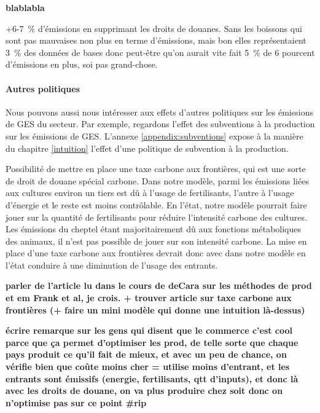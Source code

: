 \textbf{blablabla}

+6-7~\% d'émissions en supprimant les droits de douanes. Sans les boissons qui sont pas mauvaises non plus en terme d'émissions, mais bon elles représentaient 3~\% des données de bases donc peut-être qu'on aurait vite fait 5~\% de 6 pourcent d'émissions en plus, soi pas grand-chose.


\paragraph{Autres politiques}\label{Sec_subvention}
Nous pouvons aussi nous intéresser aux effets d'autres politiques sur les émissions de GES du secteur. Par exemple, regardons l'effet des subventions à la production sur les émissions de GES. L'annexe \ref{appendix:subventions} expose à la manière du chapitre \ref{intuition} l'effet d'une politique de subvention à la production.

Possibilité de mettre en place une taxe carbone aux frontières, qui est une sorte de droit de douane spécial carbone. Dans notre modèle, parmi les émissions liées aux cultures environ un tiers est dû à l'usage de fertilisants, l'autre à l'usage d'énergie et le reste est moins contrôlable. En l'état, notre modèle pourrait faire jouer sur la quantité de fertilisants pour réduire l'intensité carbone des cultures. Les émissions du cheptel étant majoritairement dû aux fonctions métaboliques des animaux, il n'est pas possible de jouer sur son intensité carbone. La mise en place d'une taxe carbone aux frontières devrait donc avec dans notre modèle en l'état conduire à une diminution de l'usage des entrants.

\textbf{parler de l'article lu dans le cours de deCara sur les méthodes de prod et em Frank et al, je crois. + trouver article sur taxe carbone aux frontières (+ faire un mini modèle qui donne une intuition là-dessus)}


\textbf{écrire remarque sur les gens qui disent que le commerce c'est cool parce que ça permet d'optimiser les prod, de telle sorte que chaque pays produit ce qu'il fait de mieux, et avec un peu de chance, on vérifie bien que coûte moins cher = utilise moins d'entrant, et les entrants sont émissifs (energie, fertilisants, qtt d'inputs), et donc là avec les droits de douane, on va plus produire chez soit donc on n'optimise pas sur ce point \#rip}